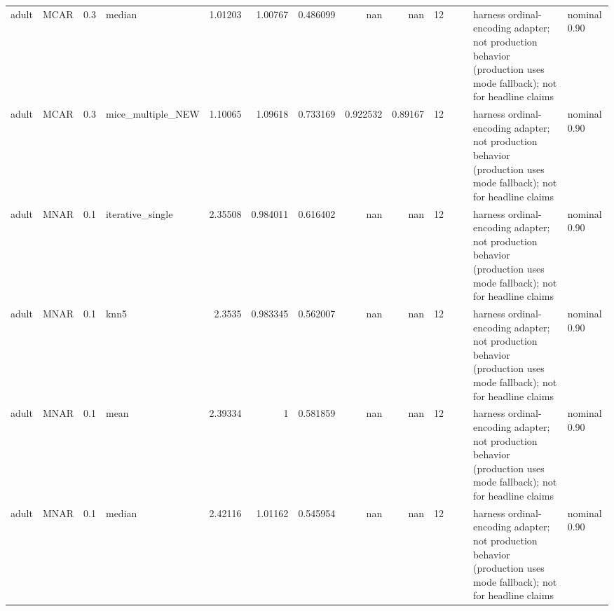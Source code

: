 \begin{table}[ht]
\begin{tabular}{llrlrrrrrrllll}
 adult                & MCAR        &         0.3 & median            &       1.01203  &             1.00767  &                 0.486099 &                     nan        &                       nan        &        12 &                    &                                         & harness ordinal-encoding adapter; not production behavior (production uses mode fallback); not for headline claims & nominal 0.90              \\
 adult                & MCAR        &         0.3 & mice\_multiple\_NEW &       1.10065  &             1.09618  &                 0.733169 &                       0.922532 &                         0.89167  &        12 &                    &                                         & harness ordinal-encoding adapter; not production behavior (production uses mode fallback); not for headline claims & nominal 0.90              \\
 adult                & MNAR        &         0.1 & iterative\_single  &       2.35508  &             0.984011 &                 0.616402 &                     nan        &                       nan        &        12 &                    &                                         & harness ordinal-encoding adapter; not production behavior (production uses mode fallback); not for headline claims & nominal 0.90              \\
 adult                & MNAR        &         0.1 & knn5              &       2.3535   &             0.983345 &                 0.562007 &                     nan        &                       nan        &        12 &                    &                                         & harness ordinal-encoding adapter; not production behavior (production uses mode fallback); not for headline claims & nominal 0.90              \\
 adult                & MNAR        &         0.1 & mean              &       2.39334  &             1        &                 0.581859 &                     nan        &                       nan        &        12 &                    &                                         & harness ordinal-encoding adapter; not production behavior (production uses mode fallback); not for headline claims & nominal 0.90              \\
 adult                & MNAR        &         0.1 & median            &       2.42116  &             1.01162  &                 0.545954 &                     nan        &                       nan        &        12 &                    &                                         & harness ordinal-encoding adapter; not production behavior (production uses mode fallback); not for headline claims & nominal 0.90              \\

\end{tabular}
\end{table}
